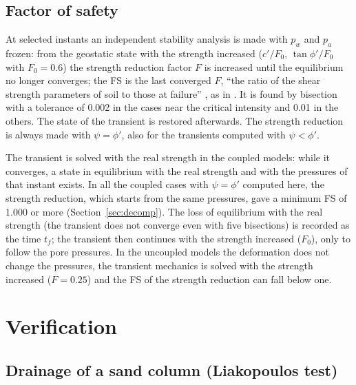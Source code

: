 \documentclass[preprint,12pt,authoryear]{elsarticle}
\begin{document}
\subsection{Factor of safety}\label{sec:fs}

At selected instants an independent stability analysis is made with $p_w$ and $p_a$ frozen: from the geostatic state
with the strength increased ($c'/F_0$, $\tan\phi'/F_0$ with $F_0=0.6$) the strength reduction factor $F$ is increased
until the equilibrium no longer converges; the FS is the last converged $F$, ``the ratio of the shear strength
parameters of soil to those at failure'' \citep[p.~4]{pradhan2022}, as in \citet{griffiths1999}. It is found by
bisection with a tolerance of 0.002 in the cases near the critical intensity and 0.01 in the others. The state of
the transient is restored afterwards. The strength reduction is always made with $\psi=\phi'$, also for the
transients computed with $\psi<\phi'$.

The transient is solved with the real strength in the coupled models: while it converges, a state in equilibrium
with the real strength and with the pressures of that instant exists. In all the coupled cases with $\psi=\phi'$
computed here, the strength reduction, which starts from the same pressures, gave a minimum FS of 1.000 or more
(Section~\ref{sec:decomp}). The loss of equilibrium with the real strength
(the transient does not converge even with five bisections) is recorded as the time $t_f$; the transient then
continues with the strength increased ($F_0$), only to follow the pore pressures. In the uncoupled models the
deformation does not change the pressures, the transient mechanics is solved with the strength increased ($F=0.25$)
and the FS of the strength reduction can fall below one.

\section{Verification}\label{sec:valid}

\subsection{Drainage of a sand column (Liakopoulos test)}
\end{document}

